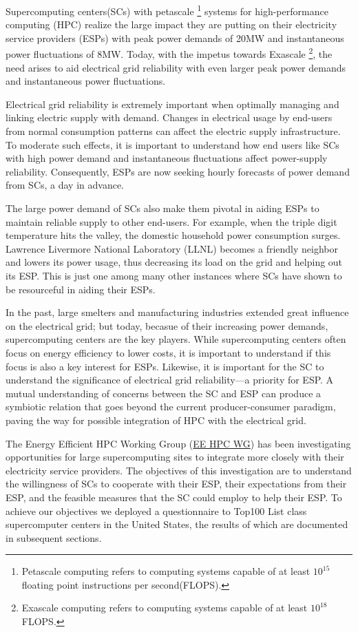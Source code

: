 Supercomputing centers(SCs) with petascale
\footnote{Petascale computing refers to computing systems capable of at
least \(10^{15}\) floating point instructions per second(FLOPS).} 
systems for high-performance computing (HPC) realize the large 
impact they are putting on their electricity service providers (ESPs) with peak 
power demands of 20MW and instantaneous power fluctuations of 8MW. 
Today, with the impetus towards Exascale
\footnote{Exascale computing refers to computing systems capable of at
least \(10^{18}\)FLOPS.}, 
the need arises to
aid electrical grid reliability  with even larger peak power demands and 
instantaneous power fluctuations.

Electrical grid reliability is extremely important when optimally managing and 
linking electric supply with demand. Changes in electrical usage by end-users from normal 
consumption patterns can affect the electric supply infrastructure. 
To moderate such effects, it is important to understand how end users like SCs with 
high power demand and instantaneous fluctuations
affect power-supply reliability. 
Consequently, ESPs are now seeking hourly forecasts of power demand from SCs, a day in advance.

The large power demand of SCs also make them pivotal in  
aiding ESPs to maintain reliable supply to other end-users. 
For example, when the triple digit temperature hits the valley,
the domestic household power consumption surges. 
Lawrence Livermore National Laboratory (LLNL) becomes a friendly neighbor and 
lowers its power usage, thus decreasing its load on the grid and helping out its ESP.
This is just one among many other instances where SCs have shown to be  
resourceful in aiding their ESPs.

In the past, large smelters and manufacturing industries extended 
great influence on the electrical grid; but today, becasue of their increasing power demands,
supercomputing centers are the key players.
While supercomputing centers often focus on energy efficiency to lower costs, 
it is important to understand if this focus is also a key interest for ESPs.
Likewise, it is important for the SC to understand the significance of electrical grid 
reliability---a priority for ESP. 
A mutual understanding of concerns between the SC and ESP can 
produce a symbiotic relation that goes beyond the current producer-consumer 
paradigm, paving the way for possible integration of HPC with the electrical grid.

The Energy Efficient HPC Working Group
(\href {http://eehpcwg.lbl.gov/}{EE HPC WG})  
has been investigating opportunities for large supercomputing sites to  
integrate more closely with their electricity service providers.
The objectives of this investigation are to understand the willingness of SCs to
cooperate with their ESP, their expectations from their ESP, and the feasible measures
that the SC could employ to help their ESP.
To achieve our objectives we deployed a questionnaire to
Top100 List class supercomputer centers in the United States, the results of
which are documented in subsequent sections.

